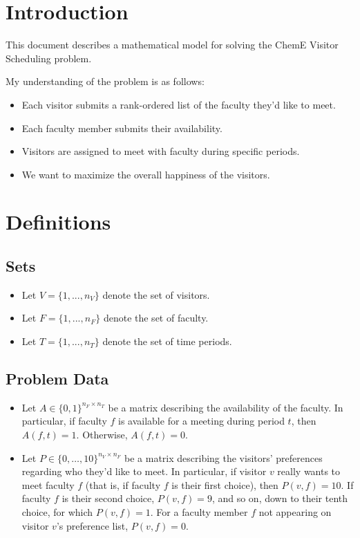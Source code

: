 \documentclass[12pt]{article}
\theoremstyle{definition}
\newtheorem{definition set}{Definition Set}%
\newtheorem{problem statement}{Problem Statement} %
\theoremstyle{remark}
\theoremstyle{remark}
\begin{document}
\maketitle

\section{Introduction}
This document describes a mathematical model for solving the ChemE Visitor Scheduling problem.

My understanding of the problem is as follows:
\begin{itemize}
\item
Each visitor submits a rank-ordered list of the faculty they\rq{}d like to meet.

\item
Each faculty member submits their availability.

\item
Visitors are assigned to meet with faculty during specific periods.

\item
We want to maximize the overall happiness of the visitors.
\end{itemize}

\section{Definitions}
\subsection{Sets}
\begin{itemize}
\item
Let $V = \{1,...,n_V\}$ denote the set of visitors.

\item
Let $F = \{1,...,n_F\}$ denote the set of faculty.

\item
Let $T = \{1,...,n_T\}$ denote the set of time periods.
\end{itemize}

\subsection{Problem Data}
\begin{itemize}
\item
Let $A \in \{0,1\}^{n_F \times n_T}$ be a matrix describing the availability of the faculty.
In particular, if faculty $f$ is available for a meeting during period $t$, then $A(f,t) = 1$.
Otherwise, $A(f,t) = 0$.

\item
Let $P \in \{0, \hdots  , 10\}^{n_V \times n_F}$ be a matrix describing the visitors\rq{} preferences regarding who they\rq{}d like to meet.
In particular, if visitor $v$ really wants to meet faculty $f$ (that is, if faculty $f$ is their first choice), then $P(v,f) = 10$.
If faculty $f$ is their second choice, $P(v,f) = 9$, and so on, down to their tenth choice, for which $P(v,f) = 1$.
For a faculty member $f$ not appearing on visitor $v$\rq{}s preference list, $P(v,f) = 0$.
\end{itemize}
\end{document}
